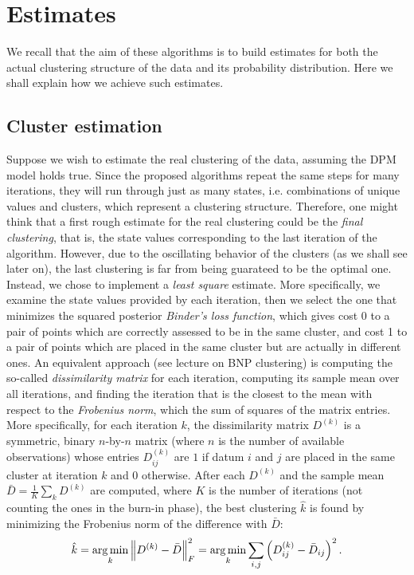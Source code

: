 \chapter{Estimates} \label{chap-esimates-1}
We recall that the aim of these algorithms is to build estimates for both the actual clustering structure of the data and its probability distribution.
Here we shall explain how we achieve such estimates.
\section{Cluster estimation}
Suppose we wish to estimate the real clustering of the data, assuming the DPM model holds true.
Since the proposed algorithms repeat the same steps for many iterations, they will run through just as many states, i.e. combinations of unique values and clusters, which represent a clustering structure.
Therefore, one might think that a first rough estimate for the real clustering could be the \emph{final clustering}, that is, the state values corresponding to the last iteration of the algorithm.
However, due to the oscillating behavior of the clusters (as we shall see later on), the last clustering is far from being guarateed to be the optimal one.
Instead, we chose to implement a \emph{least square} estimate.
More specifically, we examine the state values provided by each iteration, then we select the one that minimizes the squared posterior \emph{Binder's loss function}, which gives cost 0 to a pair of points which are correctly assessed to be in the same cluster, and cost 1 to a pair of points which are placed in the same cluster but are actually in different ones.
An equivalent approach (see \cite{beep} lecture on BNP clustering) is computing the so-called \emph{dissimilarity matrix} for each iteration, computing its sample mean over all iterations, and finding the iteration that is the closest to the mean with respect to the \emph{Frobenius norm}, which the sum of squares of the matrix entries. 
More specifically, for each iteration $k$, the dissimilarity matrix $D^{(k)}$ is a symmetric, binary $n$-by-$n$ matrix (where $n$ is the number of available observations) whose entries $D^{(k)}_{ij}$ are $1$ if datum $i$ and $j$ are placed in the same cluster at iteration $k$ and $0$ otherwise.
After each $D^{(k)}$ and the sample mean $\bar{D} = \frac{1}{K} \sum_k D^{(k)}$ are computed, where $K$ is the number of iterations (not counting the ones in the burn-in phase), the best clustering $\hat{k}$ is found by minimizing the Frobenius norm of the difference with $\bar{D}$:
$$
\hat{k} = \operatorname*{arg\,min}_k \left\lVert D^{(k)} - \bar D \right\rVert_F^2 = \operatorname*{arg\,min}_k \sum_{i,j} \left( D^{(k)}_{ij} - \bar{D}_{ij} \right)^2.
$$
